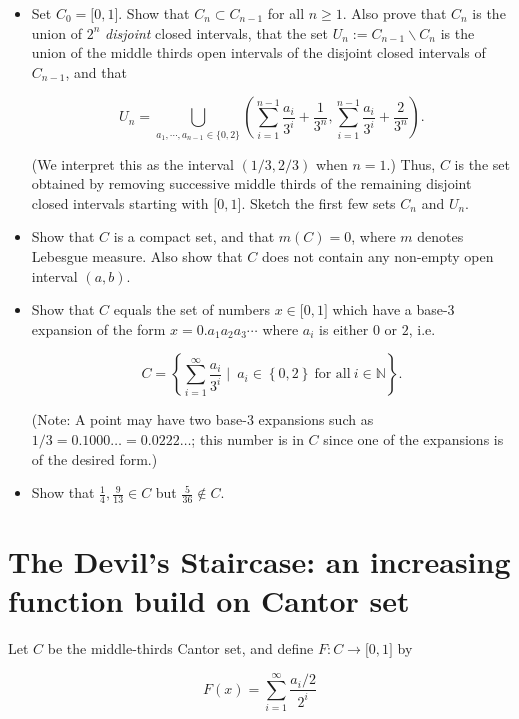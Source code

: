 \begin{itemize}
\item
  Set \(C_{0} = \lbrack 0,1\rbrack\). Show that \(C_{n} \subset C_{n - 1}\) for all \(n \geq 1\). Also prove that \(C_{n}\) is the union of \(2^{n}\) \emph{disjoint} closed intervals, that the set \(U_{n} := C_{n - 1}\backslash C_{n}\) is the union of the middle thirds open intervals of the disjoint closed intervals of \(C_{n - 1}\), and that

  \[U_{n} = \bigcup\limits_{a_{1},\cdots,a_{n - 1} \in {\{{0,2}\}}}(\sum\limits_{i = 1}^{n - 1}\frac{a_{i}}{3^{i}} + \frac{1}{3^{n}},\sum\limits_{i = 1}^{n - 1}\frac{a_{i}}{3^{i}} + \frac{2}{3^{n}}).\]

  (We interpret this as the interval \((1/3,2/3)\) when \(n = 1\).) Thus, \(C\) is the set obtained by removing successive middle thirds of the remaining disjoint closed intervals starting with \(\lbrack 0,1\rbrack\). Sketch the first few sets \(C_{n}\) and \(U_{n}\).
\item
  Show that \(C\) is a compact set, and that \(m(C) = 0\), where \(m\) denotes Lebesgue measure. Also show that \(C\) does not contain any non-empty open interval \((a,b)\).
\item
  Show that \(C\) equals the set of numbers \(x \in \lbrack 0,1\rbrack\) which have a base-3 expansion of the form \(x = 0.a_{1}a_{2}a_{3}\cdots\) where \(a_{i}\) is either \(0\) or \(2\), i.e.~

  \[C = \left\{ {\sum\limits_{i = 1}^{\infty}\frac{a_{i}}{3^{i}} \mid \ a_{i} \in \left\{ {0,2} \right\}\ \text{for all}\ i \in \mathbb{N}} \right\}.\]

  (Note: A point may have two base-3 expansions such as \(1/3 = 0.1000\ldots = 0.0222\ldots\); this number is in \(C\) since one of the expansions is of the desired form.)
\item
  Show that \(\frac{1}{4},\frac{9}{13} \in C\) but \(\frac{5}{36} \notin C\).
\end{itemize}

\section{The Devil's Staircase: an increasing function build on Cantor set}\label{the-devils-staircase-an-increasing-function-build-on-cantor-set}

Let \(C\) be the middle-thirds Cantor set, and define \(F:C\rightarrow\lbrack 0,1\rbrack\) by

\[F(x) = \sum\limits_{i = 1}^{\infty}\frac{a_{i}/2}{2^{i}}\]

